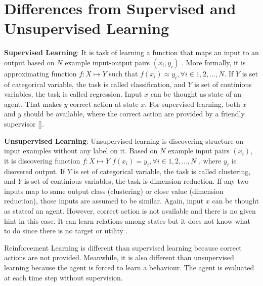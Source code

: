 \section{Differences from Supervised and Unsupervised Learning}
\label{sec:ml}

\textbf{Supervised Learning}: It is task of learning a function that maps an input to an output based on $N$ example input-output pairs $(x_i,y_i)$ \cite{russell_artificial_nodate}. More formally, it is approximating function $f \colon X \mapsto Y$ such that $ f(x_i) \approx y_i, \forall i \in {1,2,...,N} $.
If $Y$ is set of categorical variable, the task is called classification, and $Y$ is set of continious variables, the task is called regression.
Input $x$ can be thought as state of an agent. That makes $y$ correct action at state $x$. For supervised learning, both $x$ and $y$ should be available, where the correct action are provided by a friendly supervisor []. 

\textbf{Unsupervised Learning}: Unsupervised learning is discovering structure on input examples without any label on it. Based on $N$ example input pairs $(x_i)$, it is discovering function $f \colon X \mapsto Y$ $ f(x_i) = y_i, \forall i \in {1,2,...,N} $ , where $y_i$ is disovered output. 
If $Y$ is set of categorical variable, the task is called clustering, and $Y$ is set of continious variables, the task is dimension reduction. If any two inputs map to same output class (clustering) or close value (dimension reduction), those inputs are assumed to be similar.
Again, input $x$ can be thought as stateof an agent. However, correct action is not available and there is no given hint in this case. It can learn relations among states but it does not know what to do since there is no target or utility \cite{russell_artificial_nodate}. 

Reinforcement Learning is different than supervised learning because correct actions are not provided. Meanwhile, it is also different than unsupervised learning because the agent is forced to learn a behaviour. The agent is evaluated at each time step without supervision.

